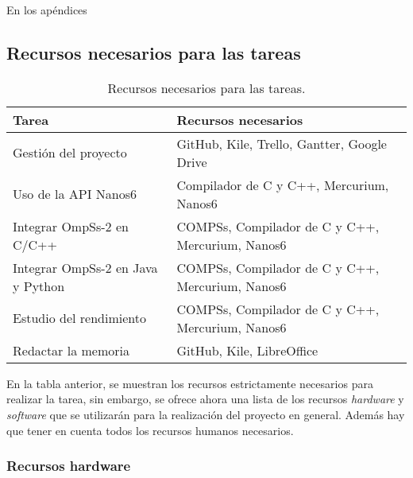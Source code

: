 En los apéndices 

\subsection{Recursos necesarios para las tareas}

\begin{table}[H]
 \centering
 \begin{tabular}{|| l | l ||}
 \hline
 Tarea & Recursos necesarios \\
 \hline\hline  
 Gestión del proyecto & GitHub, Kile, Trello, Gantter, Google Drive \\
 \hline
 Uso de la API Nanos6 & Compilador de C y C++, Mercurium, Nanos6 \\
 \hline
 Integrar OmpSs-2 en C/C++ & COMPSs, Compilador de C y C++, Mercurium, Nanos6 \\
 \hline
 Integrar OmpSs-2 en Java y Python & COMPSs, Compilador de C y C++, Mercurium, Nanos6 \\
 \hline
 Estudio del rendimiento & COMPSs, Compilador de C y C++, Mercurium, Nanos6 \\
 \hline
 Redactar la memoria & GitHub, Kile, LibreOffice \\
 \hline
 \end{tabular}
 \caption{Recursos necesarios para las tareas.}
\end{table}

En la tabla anterior, se muestran los recursos estrictamente necesarios para realizar la tarea, sin embargo, se ofrece ahora una lista de los recursos \textit{hardware} y \textit{software} que se utilizarán para la realización del proyecto en general. Además hay que tener en cuenta todos los recursos humanos necesarios.

\subsubsection{Recursos hardware}

